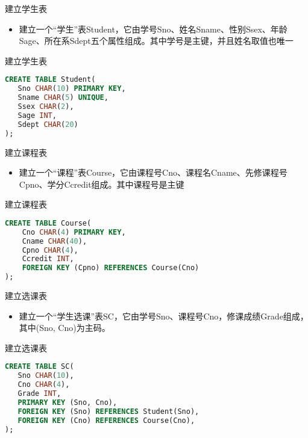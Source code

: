 \begin{frame}[fragile]{建立学生表}
\begin{itemize}
    \item 建立一个“学生”表Student，它由学号Sno、姓名Sname、性别Ssex、年龄Sage、所在系Sdept五个属性组成。其中学号是主键，并且姓名取值也唯一
\end{itemize}

\begin{block}{建立学生表}
\begin{lstlisting}[language=SQL]
CREATE TABLE Student(
   Sno CHAR(10) PRIMARY KEY,
   Sname CHAR(5) UNIQUE,
   Ssex CHAR(2),
   Sage INT,
   Sdept CHAR(20)
);
\end{lstlisting}
\end{block}  
\end{frame}


\begin{frame}[fragile]{建立课程表}
\begin{itemize}
    \item 建立一个“课程”表Course，它由课程号Cno、课程名Cname、先修课程号Cpno、学分Ccredit组成。其中课程号是主键
\end{itemize}

\begin{block}{建立课程表}
\begin{lstlisting}[language=SQL]
CREATE TABLE Course(
    Cno CHAR(4) PRIMARY KEY,
    Cname CHAR(40),
    Cpno CHAR(4),
    Ccredit INT,
    FOREIGN KEY (Cpno) REFERENCES Course(Cno)
);
\end{lstlisting}
\end{block}
    
\end{frame}


\begin{frame}[fragile]{建立选课表}
\begin{itemize}
    \item 建立一个“学生选课”表SC，它由学号Sno、课程号Cno，修课成绩Grade组成，其中(Sno, Cno)为主码。
\end{itemize}

\begin{block}{建立选课表}
\begin{lstlisting}[language=SQL]
CREATE TABLE SC(
   Sno CHAR(10),
   Cno CHAR(4),
   Grade INT,
   PRIMARY KEY (Sno, Cno),
   FOREIGN KEY (Sno) REFERENCES Student(Sno),
   FOREIGN KEY (Cno) REFERENCES Course(Cno),
);
\end{lstlisting}
\end{block}
    
\end{frame}


